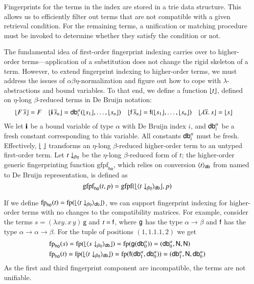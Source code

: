 Fingerprints for the terms in the index are stored in a trie data structure.
This allows us to efficiently filter out terms that are not compatible with a given
retrieval condition. For the remaining terms, a unification or matching
procedure must be invoked to determine whether they satisfy the condition or not.

The fundamental idea of first-order fingerprint indexing carries over to
higher-order terms---application of a substitution does not change the rigid skeleton of a term.
However, to extend fingerprint indexing to
higher-order terms, we must address the issues of $\alpha\beta\eta$-normalization and figure out how to cope with $\lambda$-abstractions and
bound variables. To that end, we define a function $\lfloor t\rfloor$, defined on
$\eta$-long $\beta$-reduced terms in De Bruijn \cite{db-75-dbindices} notation:
\begin{align*}
& \lfloor F \, \overline{s}\rfloor = F
&& \lfloor\mathbf{i} \, \overline{s}_n \rfloor = \textsf{db}_{i}^{\alpha}(\lfloor s_1\rfloor, \ldots, \lfloor s_n\rfloor)
&& \lfloor\mathsf{f} \, \overline{s}_n \rfloor = \mathsf{f}(\lfloor s_1\rfloor, \ldots, \lfloor s_n\rfloor) &&
\lfloor\lambda \overline{x}. \, s  \rfloor = \lfloor s\rfloor
\end{align*}
We let $\mathbf{i}$ be a bound variable of type $\alpha$ with De Bruijn index $i$,
and $\textsf{db}_{i}^{\alpha}$ be a fresh constant corresponding to this variable. All constants
$\textsf{db}_{i}^{\alpha}$ must be fresh. 
Effectively, $\lfloor\;\rfloor$ transforms an $\eta$-long $\beta$-reduced higher-order term to an untyped first-order term. Let $\nf{t}{\beta\eta}$ be
the $\eta$-long $\beta$-reduced form of $t$; the higher-order generic
fingerprinting function $\text{gfpf}_\textsf{ho}$, which relies on conversion $\langle t \rangle_\textsf{db}$ from
named to De Bruijn representation, is defined as
\[
  \text{gfpf}_\textsf{ho}(t,p) =
    \text{gfpf}(\hotofo{\nametodb{\nf{t}{\beta\eta}}}, p)
\]

If we define $\text{fp}_\textsf{ho}(t) =
\text{fp}(\hotofo{\nametodb{\nf{t}{\beta\eta}}})$, we can support fingerprint indexing
for higher-order terms with no changes to the compatibility matrices. For example,
consider the terms $s = (\lambda x y. \, x \, y) \, \textsf{g}$ and $t = \mathsf{f}$,
where $\mathsf{g}$ has the type $\alpha \rightarrow \beta$ and $\mathsf{f}$ has the
type $\alpha \rightarrow \alpha \rightarrow \beta$. 
For the tuple of
positions $(1, 1.1.1, 2)$ we get
\begin{align*}
  & \text{fp}_\textsf{ho}(s) =
    \text{fp}(\hotofo{\nametodb{\nf{s}{\beta\eta}}}) =
    \text{fp}(\cst{g}(\cstdba{0})) = 
    (\cstdba{0}, \NN, \NN) \\
  & \text{fp}_\textsf{ho}(t) =
   \text{fp}(\hotofo{\nametodb{\nf{t}{\beta\eta}}}) =
    \text{fp}(\cst{f}(\cstdba{1}, \cstdba{0})) = 
    (\cstdba{1}, \NN, \cstdba{0})
\end{align*}
As the first and third fingerprint component are incompatible, the terms are not unifiable.

